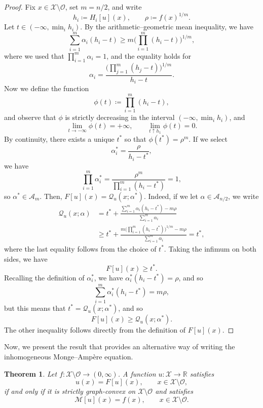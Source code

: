 \documentclass[reqno,11pt]{amsart}
\numberwithin{equation}{section}
\newtheorem{theorem}{Theorem}[section]
\theoremstyle{definition}
\theoremstyle{remark}
\begin{document}
\begin{proof}
Fix \(x\in\mathcal X\setminus\mathcal O\), set \(m=n/2\), and write
\[
    h_i\coloneqq H_i[u](x),
    \qquad
    \rho\coloneqq f(x)^{1/m}.
\]
Let $t \in (-\infty,\min_i h_i)$. By the arithmetic–geometric mean inequality, we have
\[
    \sum_{i=1}^{m} \alpha_i(h_i - t) \geq m \bigg(\prod_{i=1}^m(h_i - t)\bigg)^{1/m},
\]
where we used that $\prod_{i=1}^m \alpha_i = 1$, and the equality holds for
\[
    \alpha_i = \frac{\bigg(\prod_{j=1}^m(h_j - t) \bigg)^{1/m}}{h_i - t}.
\]
Now we define the function
\[
    \phi(t) \coloneqq \prod_{i=1}^m(h_i - t),
\]
and observe that $\phi$ is strictly decreasing in the interval $(-\infty,\min_i h_i)$, and 
\[
    \lim_{t\to-\infty}\phi(t)=+\infty,
    \qquad
    \lim_{t\uparrow h_1}\phi(t)=0.
\]
By continuity, there exists a unique $t^*$ so that $\phi(t^*)=\rho^m$. If we select
\[
    \alpha_i^* = \frac{\rho}{h_i - t^*},
\]
we have
\[
    \prod_{i=1}^{m}\alpha_i^*
    =
    \frac{\rho^m}{\prod_{i=1}^{m}(h_i-t^*)}
    =1,
\]
so \(\alpha^*\in\mathcal A_m\). Then, \(F[u](x) = \mathcal{Q}_u(x;\alpha^*)\). Indeed, if we let $\alpha \in \mathcal{A}_{n/2}$, we write 
\begin{align*}
    \mathcal{Q}_u(x;\alpha) & = t^* + \frac{\sum_{i=1}^{m} \alpha_i (h_i-t^*) - m\rho}{\sum_{i=1}^{m} \alpha_i}\\
    & \geq  t^* + \frac{m \bigg(\prod_{i=1}^m(h_i - t^*)\bigg)^{1/m} - m\rho}{\sum_{i=1}^{m} \alpha_i} = t^*,
\end{align*}
where the last equality follows from the choice of $t^*$. Taking the infimum on both sides, we have
\[
    F[u](x) \geq t^*.
\]
Recalling the definition of $\alpha_i^*$, we have $\alpha_i^*(h_i-t^*) = \rho$, and so
\[
    \sum_{i=1}^{m} \alpha_i^*(h_i-t^*) = m\rho,
\]
but this means that $t^* = \mathcal{Q}_u(x;\alpha^*)$, and so 
\[
    F[u](x) \geq \mathcal{Q}_u(x;\alpha^*).
\]
The other inequality follows directly from the definition of \(F[u](x)\).
\end{proof}

Now, we present the result that provides an alternative way of writing the inhomogeneous Monge--Amp\`ere equation.

\begin{theorem}\label{theorem:equivalent-formulation}
Let \(f\colon\mathcal X\setminus\mathcal O\to(0,\infty)\).
A function \(u\colon\mathcal X\to\mathbb R\) satisfies
\begin{equation}\label{eq:closed-form-MA}
    u(x)=F[u](x),
    \qquad x\in\mathcal X\setminus\mathcal O,
\end{equation}
if and only if it is strictly graph-convex on
\(\mathcal X\setminus\mathcal O\) and satisfies
\[
    \mathcal M[u](x)=f(x),
    \qquad x\in\mathcal X\setminus\mathcal O.
\]
\end{theorem}
\end{document}
